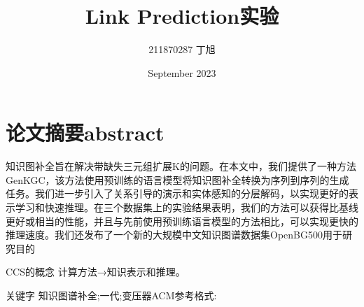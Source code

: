 \documentclass{article}
\title{Link Prediction实验}
\author{211870287 丁旭}
\date{September 2023}
\begin{document}
\maketitle

\section{论文摘要abstract}
知识图补全旨在解决带缺失三元组扩展K的问题。在本文中，我们提供了一种方法GenKGC，该方法使用预训练的语言模型将知识图补全转换为序列到序列的生成任务。我们进一步引入了关系引导的演示和实体感知的分层解码，以实现更好的表示学习和快速推理。在三个数据集上的实验结果表明，我们的方法可以获得比基线更好或相当的性能，并且与先前使用预训练语言模型的方法相比，可以实现更快的推理速度。我们还发布了一个新的大规模中文知识图谱数据集OpenBG500用于研究目的 
\par CCS的概念 
计算方法→知识表示和推理。
\par 关键字
知识图谱补全;一代;变压器ACM参考格式:
\end{document}
